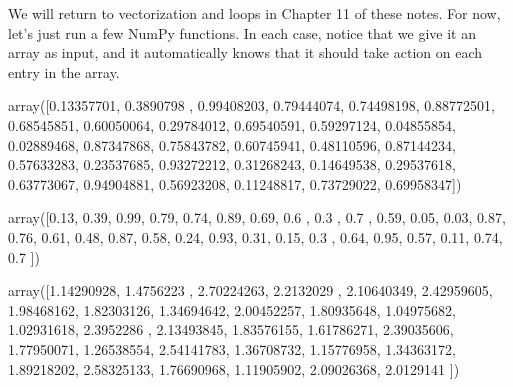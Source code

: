 \documentclass[letterpaper,10pt,english]{sphinxmanual}
\begin{document}
We will return to vectorization and loops in Chapter 11 of these notes.  For now, let’s just run a few NumPy functions.  In each case, notice that we give it an array as input, and it automatically knows that it should take action on each entry in the array.

\begin{sphinxVerbatim}[commandchars=\\\{\}]
   
    
\end{sphinxVerbatim}

\begin{sphinxVerbatim}[commandchars=\\\{\}]
array([0.13357701, 0.3890798 , 0.99408203, 0.79444074, 0.74498198,
       0.88772501, 0.68545851, 0.60050064, 0.29784012, 0.69540591,
       0.59297124, 0.04855854, 0.02889468, 0.87347868, 0.75843782,
       0.60745941, 0.48110596, 0.87144234, 0.57633283, 0.23537685,
       0.93272212, 0.31268243, 0.14649538, 0.29537618, 0.63773067,
       0.94904881, 0.56923208, 0.11248817, 0.73729022, 0.69958347])
\end{sphinxVerbatim}

\begin{sphinxVerbatim}[commandchars=\\\{\}]
    
\end{sphinxVerbatim}

\begin{sphinxVerbatim}[commandchars=\\\{\}]
array([0.13, 0.39, 0.99, 0.79, 0.74, 0.89, 0.69, 0.6 , 0.3 , 0.7 , 0.59,
       0.05, 0.03, 0.87, 0.76, 0.61, 0.48, 0.87, 0.58, 0.24, 0.93, 0.31,
       0.15, 0.3 , 0.64, 0.95, 0.57, 0.11, 0.74, 0.7 ])
\end{sphinxVerbatim}

\begin{sphinxVerbatim}[commandchars=\\\{\}]
   
\end{sphinxVerbatim}

\begin{sphinxVerbatim}[commandchars=\\\{\}]
array([1.14290928, 1.4756223 , 2.70224263, 2.2132029 , 2.10640349,
       2.42959605, 1.98468162, 1.82303126, 1.34694642, 2.00452257,
       1.80935648, 1.04975682, 1.02931618, 2.3952286 , 2.13493845,
       1.83576155, 1.61786271, 2.39035606, 1.77950071, 1.26538554,
       2.54141783, 1.36708732, 1.15776958, 1.34363172, 1.89218202,
       2.58325133, 1.76690968, 1.11905902, 2.09026368, 2.0129141 ])
\end{sphinxVerbatim}
\end{document}
